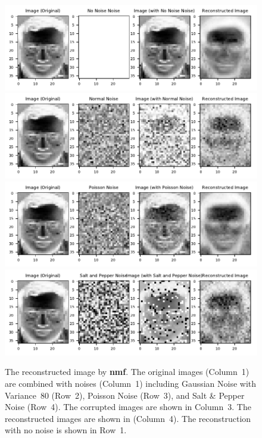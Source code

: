 \begin{figure}
	\centering
	\includegraphics[scale=.9]{Result_Multiplication_Euclidean_No_Noise_Comparison}\\
	\includegraphics[scale=.9]{Result_Multiplication_Euclidean_Normal_Comparison}\\
	\includegraphics[scale=.9]{Result_Multiplication_Euclidean_Poisson_Comparison}\\
	\includegraphics[scale=.9]{Result_Multiplication_Euclidean_Salt_and_Pepper_Comparison}
	\caption{The reconstructed image by \textbf{nmf}. The original images (Column~1) are combined with noises (Column~1) including Gaussian Noise with Variance~$80$ (Row~2), Poisson Noise (Row~3), and Salt \& Pepper Noise (Row~4). The corrupted images are shown in Column~3. The reconstructed images are shown in (Column~4). The reconstruction with no noise is shown in Row~1.}\label{noisesnmff}
\end{figure}
